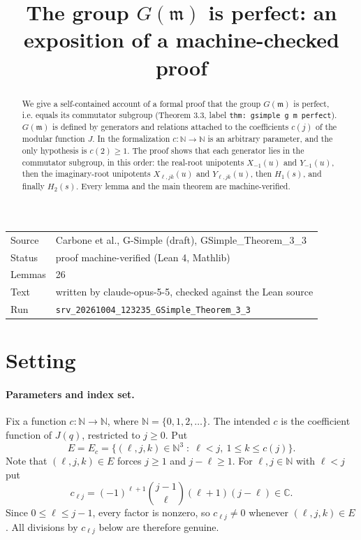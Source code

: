 \documentclass[11pt]{article}
\title{The group $G(\mathfrak m)$ is perfect: an exposition of a machine-checked proof}
\date{}
\theoremstyle{definition}
\theoremstyle{remark}
\newcommand{\C}{\mathbb{C}}
\newcommand{\N}{\mathbb{N}}
\begin{document}
\maketitle
\begin{abstract}
We give a self-contained account of a formal proof that the group $G(\mathfrak m)$ is perfect, i.e. equals its commutator subgroup (Theorem 3.3, label \texttt{thm: gsimple g m perfect}). $G(\mathfrak m)$ is defined by generators and relations attached to the coefficients $c(j)$ of the modular function $J$. In the formalization $c\colon\mathbb N\to\mathbb N$ is an arbitrary parameter, and the only hypothesis is $c(2)\ge 1$. The proof shows that each generator lies in the commutator subgroup, in this order: the real-root unipotents $X_{-1}(u)$ and $Y_{-1}(u)$, then the imaginary-root unipotents $X_{\ell,jk}(u)$ and $Y_{\ell,jk}(u)$, then $H_1(s)$, and finally $H_2(s)$. Every lemma and the main theorem are machine-verified.
\end{abstract}

\begin{center}\small
\begin{tabular}{@{}ll@{}}
\toprule
Source & Carbone et al., G-Simple (draft), GSimple\_Theorem\_3\_3 \\
Status & proof machine-verified (Lean 4, Mathlib) \\
Lemmas & 26 \\
Text & written by claude-opus-5-5, checked against the Lean source \\
Run & \texttt{srv\_20261004\_123235\_GSimple\_Theorem\_3\_3} \\
\bottomrule
\end{tabular}
\end{center}

\tableofcontents

\section{Setting}

\paragraph{Parameters and index set.}
Fix a function $c\colon \N\to\N$, where $\N=\{0,1,2,\dots\}$. The intended $c$ is the coefficient function of $J(q)$, restricted to $j\ge 0$. Put
\[
E=E_c=\{(\ell,j,k)\in\N^3 \;:\; \ell<j,\ 1\le k\le c(j)\}.
\]
Note that $(\ell,j,k)\in E$ forces $j\ge 1$ and $j-\ell\ge 1$. For $\ell,j\in\N$ with $\ell<j$ put
\[
c_{\ell j}=(-1)^{\ell+1}\binom{j-1}{\ell}(\ell+1)(j-\ell)\in\C .
\]
Since $0\le\ell\le j-1$, every factor is nonzero, so $c_{\ell j}\neq 0$ whenever $(\ell,j,k)\in E$. All divisions by $c_{\ell j}$ below are therefore genuine.
\end{document}
